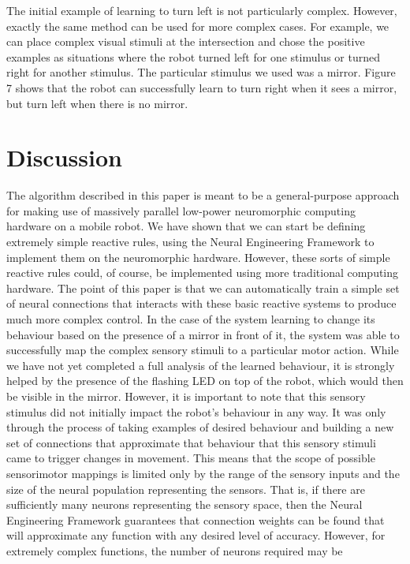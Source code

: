 \documentclass[conference]{IEEEtran}
\begin{document}
The initial example of learning to turn left is not
particularly complex. However, exactly the same method
can be used for more complex cases. For example, we can
place complex visual stimuli at the intersection and chose
the positive examples as situations where the robot turned
left for one stimulus or turned right for another stimulus.
The particular stimulus we used was a mirror. Figure 7
shows that the robot can successfully learn to turn right
when it sees a mirror, but turn left when there is no mirror.

\section{Discussion}
The algorithm described in this paper is meant to be a
general-purpose approach for making use of massively
parallel low-power neuromorphic computing hardware on a
mobile robot. We have shown that we can start be defining
extremely simple reactive rules, using the Neural
Engineering Framework to implement them on the
neuromorphic hardware. However, these sorts of simple
reactive rules could, of course, be implemented using more
traditional computing hardware. The point of this paper is
that we can automatically train a simple set of neural
connections that interacts with these basic reactive systems
to produce much more complex control.
In the case of the system learning to change its behaviour
based on the presence of a mirror in front of it, the system
was able to successfully map the complex sensory stimuli to
a particular motor action. While we have not yet completed
a full analysis of the learned behaviour, it is strongly helped
by the presence of the flashing LED on top of the robot,
which would then be visible in the mirror. However, it is
important to note that this sensory stimulus did not initially
impact the robot's behaviour in any way. It was only through
the process of taking examples of desired behaviour and
building a new set of connections that approximate that
behaviour that this sensory stimuli came to trigger changes in
movement.
This means that the scope of possible sensorimotor
mappings is limited only by the range of the sensory inputs
and the size of the neural population representing the
sensors. That is, if there are sufficiently many neurons
representing the sensory space, then the Neural Engineering
Framework guarantees that connection weights can be
found that will approximate any function with any desired
level of accuracy. However, for extremely complex
functions, the number of neurons required may be
\end{document}
